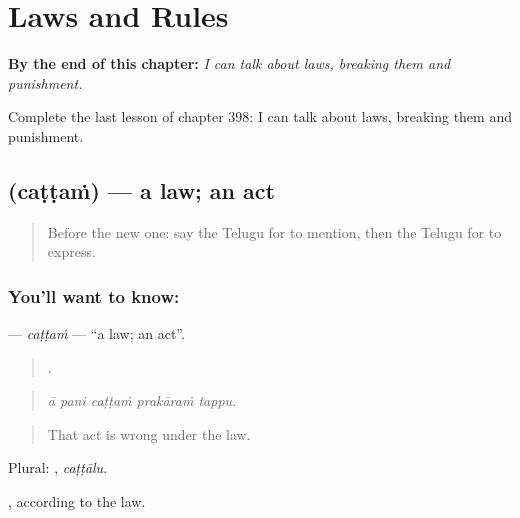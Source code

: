 
\chapter{Laws and Rules}
\label{ch:te-laws-and-rules}

\begin{chapteropening}
\textbf{By the end of this chapter:} \emph{I can talk about laws, breaking them and punishment.}

Complete the last lesson of chapter 398: I can talk about laws, breaking them and punishment.
\end{chapteropening}

\section[\texorpdfstring{\te{చట్టం} (caṭṭaṁ)}{చట్టం (caṭṭaṁ)}]{ (caṭṭaṁ) — a law; an act}

\label{lesson:TE-C398-cattam}



\begin{quote}
Before the new one: say the Telugu for to mention, then the Telugu for to express.
\end{quote}

\subsection*{You'll want to know: }
\textbf{} — \emph{caṭṭaṁ} — \textquotedblleft{}a law; an act\textquotedblright{}.

\begin{quote}
    .
\end{quote}

\begin{quote}
\emph{ā pani caṭṭaṁ prakāraṁ tappu.}
\end{quote}

\begin{quote}
That act is wrong under the law.
\end{quote}

Plural: , \emph{caṭṭālu}.

 , according to the law.

